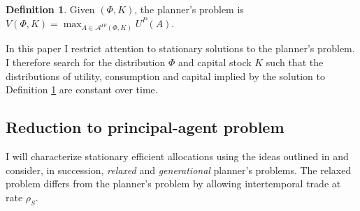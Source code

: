 \documentclass[11pt]{article}
\theoremstyle{plain}
\theoremstyle{definition} %
\newtheorem{defn}{Definition}[section]
\begin{document}
\begin{defn}\label{planprob}
Given $(\Phi, K)$, the planner's problem is $V(\Phi,K) = \max_{A \in \mathcal{A}^{IF}(\Phi,K)} U^P(A)$.
\end{defn}

In this paper I restrict attention to stationary solutions to the planner's problem. I therefore search for the distribution $\Phi$ and capital stock $K$ such that the distributions of utility, consumption and capital implied by the solution to Definition \ref{planprob} are constant over time. 

\subsection{Reduction to principal-agent problem}\label{reduct}

I will characterize stationary efficient allocations using the ideas outlined in \cite{farhi_inequality_2007} and consider, in succession, \emph{relaxed} and \emph{generational} planner's problems. The relaxed problem differs from the planner's problem by allowing intertemporal trade at rate $\rho_S$.
\end{document}
